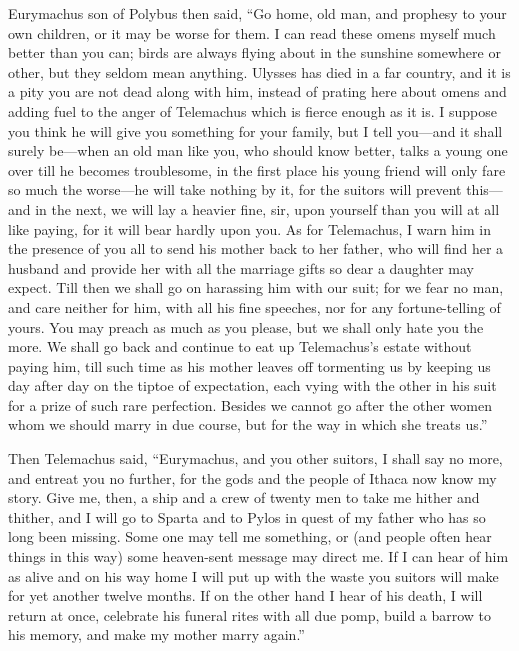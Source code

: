 Eurymachus son of Polybus then said, “Go home, old man, and prophesy to your
own children, or it may be worse for them. I can read these omens myself much
better than you can; birds are always flying about in the sunshine somewhere or
other, but they seldom mean anything. Ulysses has died in a far country, and it
is a pity you are not dead along with him, instead of prating here about omens
and adding fuel to the anger of Telemachus which is fierce enough as it is. I
suppose you think he will give you something for your family, but I tell
you—and it shall surely be—when an old man like you, who should know better,
talks a young one over till he becomes troublesome, in the first place his
young friend will only fare so much the worse—he will take nothing by it, for
the suitors will prevent this—and in the next, we will lay a heavier fine, sir,
upon yourself than you will at all like paying, for it will bear hardly upon
you. As for Telemachus, I warn him in the presence of you all to send his
mother back to her father, who will find her a husband and provide her with all
the marriage gifts so dear a daughter may expect. Till then we shall go on
harassing him with our suit; for we fear no man, and care neither for him, with
all his fine speeches, nor for any fortune-telling of yours. You may preach as
much as you please, but we shall only hate you the more. We shall go back and
continue to eat up Telemachus’s estate without paying him, till such time as
his mother leaves off tormenting us by keeping us day after day on the tiptoe
of expectation, each vying with the other in his suit for a prize of such rare
perfection. Besides we cannot go after the other women whom we should marry in
due course, but for the way in which she treats us.”

Then Telemachus said, “Eurymachus, and you other suitors, I shall say no more,
and entreat you no further, for the gods and the people of Ithaca now know my
story. Give me, then, a ship and a crew of twenty men to take me hither and
thither, and I will go to Sparta and to Pylos in quest of my father who has so
long been missing. Some one may tell me something, or (and people often hear
things in this way) some heaven-sent message may direct me. If I can hear of
him as alive and on his way home I will put up with the waste you suitors will
make for yet another twelve months. If on the other hand I hear of his death, I
will return at once, celebrate his funeral rites with all due pomp, build a
barrow to his memory, and make my mother marry again.”


